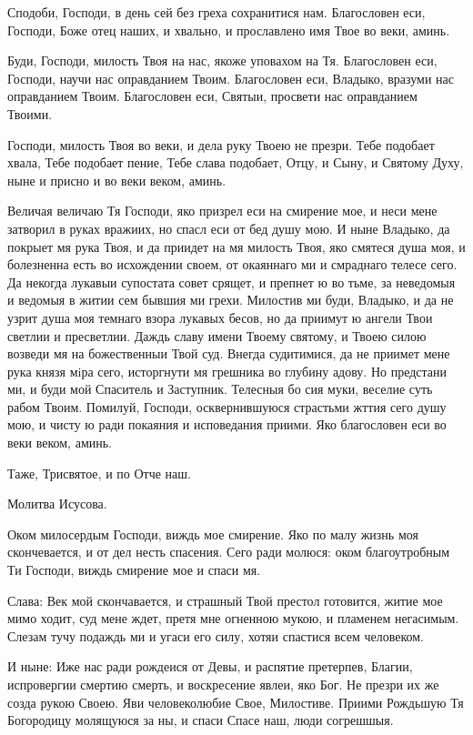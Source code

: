 Сподоби, Господи, в день сей без греха сохранитися нам. Благословен еси, Господи, Боже отец наших, и хвально, и прославлено имя Твое во веки, аминь.

Буди, Господи, милость Твоя на нас, якоже уповахом на Тя. Благословен еси, Господи, научи нас оправданием Твоим. Благословен еси, Владыко, вразуми нас оправданием Твоим. Благословен еси, Святыи, просвети нас оправданием Твоими.

Господи, милость Твоя во веки, и дела  руку Твоею не презри. Тебе подобает хвала, Тебе подобает пение, Тебе слава подобает, Отцу, и Сыну, и Святому Духу, ныне и присно и во веки веком, аминь.



Величая величаю Тя Господи, яко призрел еси на смирение мое, и неси мене затворил в руках вражиих, но спасл еси от бед душу мою. И ныне Владыко, да покрыет мя рука Твоя, и да приидет на мя милость Твоя, яко смятеся душа моя, и болезненна есть во исхождении своем, от окаяннаго ми и смраднаго телесе сего. Да некогда лукавыи супостата совет срящет, и препнет ю во тьме, за неведомыя и ведомыя в житии сем бывшия ми грехи. Милостив ми буди, Владыко, и да не узрит душа моя темнаго взора лукавых бесов, но да приимут ю ангели Твои светлии  и пресветлии. Даждь славу имени Твоему святому, и Твоею силою возведи мя на божественныи Твой суд. Внегда судитимися, да не приимет мене рука князя мiра сего, исторгнути мя грешника во глубину адову. Но предстани ми, и буди мой Спаситель и Заступник. Телесныя бо сия муки, веселие суть рабом Твоим. Помилуй, Господи, осквернившуюся страстьми жттия сего душу мою, и чисту ю ради покаяния и исповедания приими. Яко благословен еси во веки веком, аминь.


Таже, Трисвятое, и по Отче наш.

Молитва Исусова.




Оком милосердым Господи, виждь мое смирение. Яко по малу жизнь моя скончевается, и от дел несть спасения. Сего ради молюся: оком благоутробным Ти Господи, виждь смирение мое и спаси мя.

Слава: Век мой скончавается, и страшный Твой престол готовится, житие мое мимо ходит, суд мене ждет, претя мне огненною мукою, и пламенем негасимым. Слезам тучу подаждь ми и угаси его силу, хотяи спастися всем человеком.

И ныне: Иже нас ради рождеися от Девы, и распятие претерпев, Благии, испровергии смертию смерть, и воскресение явлеи, яко Бог. Не презри их же созда рукою Своею. Яви человеколюбие Свое, Милостиве. Приими Рождьшую Тя Богородицу молящуюся за ны, и спаси Спасе наш, люди согрешшыя.

